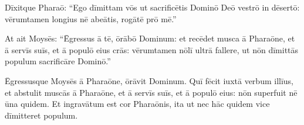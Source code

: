 Dīxitque
Pharaō: ``Ego dīmittam vōs ut 
sacrificētis Dominō Deō vestrō
in dēsertō: vērumtamen longius nē abeātis, rogātē prō mē.''

At ait Moysēs: ``Ēgressus ā tē, ōrābō Dominum: et
recēdet musca ā Pharaōne, et ā servīs suīs,
et ā populō eius crās: vērumtamen nōlī ultrā fallere, ut
nōn dīmittās populum 
sacrificāre Dominō.''

Ēgressusque Moysēs ā
Pharaōne, ōrāvit Dominum.  Quī fēcit iuxtā verbum illīus,
et abstulit muscās ā Pharaōne, et ā servīs
suīs, et ā populō eius: nōn superfuit nē ūna quidem.  Et
ingravātum est cor
Pharaōnis, ita ut nec hāc quidem vice dīmitteret populum.

